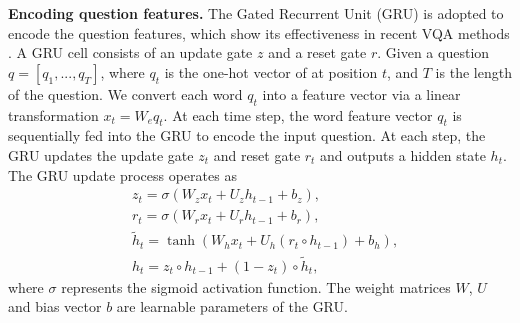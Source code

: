 \documentclass[letterpaper]{article}
\begin{document}
\textbf{Encoding question features.} The Gated Recurrent Unit (GRU) \cite{cho2014learning} is adopted to encode the question features, which show  its effectiveness in recent VQA methods \cite{lu2016hierarchical,kim2016hadamard}. A GRU cell consists of an update gate $z$ and a reset gate $r$. Given a question $q = [q_1,..., q_T]$, where $q_t$ is the one-hot vector of at position $t$, and $T$ is the length of the question. We convert each word $q_t$ into a feature vector via a linear transformation $x_t = W_eq_t$. At each time step, the word feature vector $q_t$ is sequentially fed into the GRU to encode the input question. At each step, the GRU updates the update gate $z_t$ and reset gate $r_t$ and outputs a hidden state $h_t$. The GRU update process operates as
\begin{align}
	&z_{t}=\sigma(W_{z}x_{t}+U_{z}h_{t-1}+b_{z}), \\
	&r_{t}=\sigma(W_{r}x_{t}+U_{r}h_{t-1}+b_{r}), \\
	&\tilde{h}_{t}=\tanh(W_{h}x_{t}+U_{h}(r_{t}\circ h_{t-1})+b_{h}), \\
	&h_{t}=z_{t}\circ h_{t-1}+(1-z_{t}) \circ \tilde{h}_{t},
\end{align}
where $\sigma$ represents the sigmoid activation function. The weight matrices $W$, $U$ and bias vector $b$ are learnable parameters of the GRU.
\end{document}
